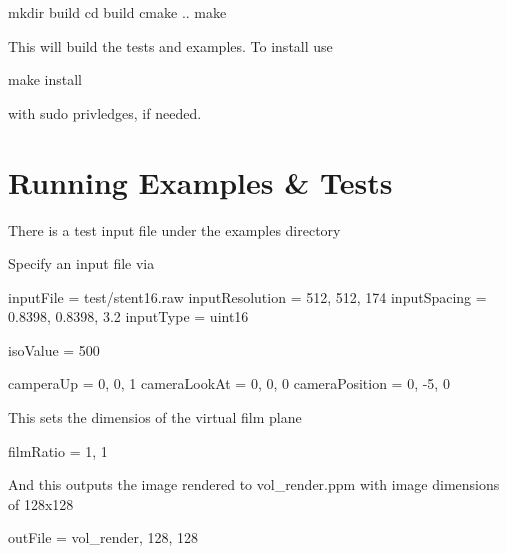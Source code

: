 \begin{DoxyCode}
mkdir build
cd build
cmake ..
make 
\end{DoxyCode}


This will build the tests and examples. To install use 
\begin{DoxyCode}
make install
\end{DoxyCode}
 with sudo privledges, if needed.

\section*{Running Examples \& Tests }

There is a test input file under the examples directory

Specify an input file via


\begin{DoxyCode}
inputFile = test/stent16.raw
inputResolution = 512, 512, 174
inputSpacing = 0.8398, 0.8398, 3.2
inputType = uint16

isoValue = 500

camperaUp = 0, 0, 1
cameraLookAt = 0, 0, 0
cameraPosition = 0, -5, 0
\end{DoxyCode}


This sets the dimensios of the virtual film plane 
\begin{DoxyCode}
filmRatio = 1, 1
\end{DoxyCode}


And this outputs the image rendered to vol\+\_\+render.\+ppm with image dimensions of 128x128 
\begin{DoxyCode}
outFile = vol\_render, 128, 128
\end{DoxyCode}
 